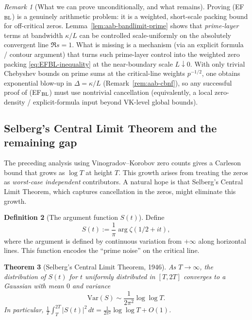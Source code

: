 \documentclass[11pt]{article}
\newtheorem{theorem}{Theorem}
\theoremstyle{definition}
\newtheorem{definition}[theorem]{Definition}
\theoremstyle{remark}
\newtheorem{remark}[theorem]{Remark}
\theoremstyle{definition}
\begin{document}
\begin{remark}[What we can prove unconditionally, and what remains]\label{rem:EFBL-status}
Proving \textup{(EF$_{\rm BL}$)} is a genuinely arithmetic problem: it is a weighted, short-scale packing bound for off-critical zeros.
Lemma~\ref{lem:aab-bandlimit-prime} shows that \emph{prime-layer} terms at bandwidth $\kappa/L$ can be controlled scale-uniformly on the absolutely convergent line $\Re s=1$.
What is missing is a mechanism (via an explicit formula / contour argument) that turns such prime-layer control into the weighted zero packing \eqref{eq:EFBL-inequality} at the near-boundary scale $L\downarrow 0$.
With only trivial Chebyshev bounds on prime sums at the critical-line weights $p^{-1/2}$, one obtains exponential blow-up in $\Delta=\kappa/L$ (Remark~\ref{rem:aab-cbnf}), so any successful proof of \textup{(EF$_{\rm BL}$)} must use nontrivial cancellation (equivalently, a local zero-density / explicit-formula input beyond VK-level global bounds).
\end{remark}

\subsection*{Selberg's Central Limit Theorem and the remaining gap}\label{sec:selberg-clt}

The preceding analysis using Vinogradov--Korobov zero counts gives a Carleson bound that grows as $\log T$ at height $T$. This growth arises from treating the zeros as \emph{worst-case independent} contributors. A natural hope is that Selberg's Central Limit Theorem, which captures cancellation in the zeros, might eliminate this growth.

\begin{definition}[The argument function $S(t)$]
Define
\[
  S(t) := \frac{1}{\pi}\arg\zeta(1/2 + it),
\]
where the argument is defined by continuous variation from $+\infty$ along horizontal lines. This function encodes the ``prime noise'' on the critical line.
\end{definition}

\begin{theorem}[Selberg's Central Limit Theorem, 1946]\label{thm:selberg-clt}
As $T \to \infty$, the distribution of $S(t)$ for $t$ uniformly distributed in $[T, 2T]$ converges to a Gaussian with mean $0$ and variance
\[
  \mathrm{Var}(S) \sim \frac{1}{2\pi^2}\log\log T.
\]
In particular, $\displaystyle\frac{1}{T}\int_T^{2T} |S(t)|^2\,dt = \frac{1}{2\pi^2}\log\log T + O(1)$.
\end{theorem}
\end{document}

